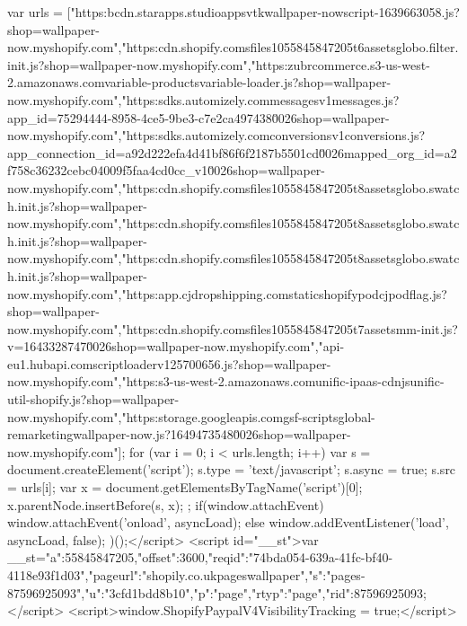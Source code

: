 {{{{{{{    var urls = ["https:\/\/bcdn.starapps.studio\/apps\/vtk\/wallpaper-now\/script-1639663058.js?shop=wallpaper-now.myshopify.com","https:\/\/cdn.shopify.com\/s\/files\/1\/0558\/4584\/7205\/t\/6\/assets\/globo.filter.init.js?shop=wallpaper-now.myshopify.com","https:\/\/zubrcommerce.s3-us-west-2.amazonaws.com\/variable-products\/variable-loader.js?shop=wallpaper-now.myshopify.com","https:\/\/sdks.automizely.com\/messages\/v1\/messages.js?app_id=75294444-8958-4ce5-9be3-c7e2ca497438\u0026shop=wallpaper-now.myshopify.com","https:\/\/sdks.automizely.com\/conversions\/v1\/conversions.js?app_connection_id=a92d222efa4d41bf86f6f2187b5501cd\u0026mapped_org_id=a2f758c36232cebc04009f5faa4cd0cc_v1\u0026shop=wallpaper-now.myshopify.com","https:\/\/cdn.shopify.com\/s\/files\/1\/0558\/4584\/7205\/t\/8\/assets\/globo.swatch.init.js?shop=wallpaper-now.myshopify.com","https:\/\/cdn.shopify.com\/s\/files\/1\/0558\/4584\/7205\/t\/8\/assets\/globo.swatch.init.js?shop=wallpaper-now.myshopify.com","https:\/\/cdn.shopify.com\/s\/files\/1\/0558\/4584\/7205\/t\/8\/assets\/globo.swatch.init.js?shop=wallpaper-now.myshopify.com","https:\/\/app.cjdropshipping.com\/static\/shopify\/pod\/cjpodflag.js?shop=wallpaper-now.myshopify.com","https:\/\/cdn.shopify.com\/s\/files\/1\/0558\/4584\/7205\/t\/7\/assets\/mm-init.js?v=1643328747\u0026shop=wallpaper-now.myshopify.com","\/\/api-eu1.hubapi.com\/scriptloader\/v1\/25700656.js?shop=wallpaper-now.myshopify.com","https:\/\/s3-us-west-2.amazonaws.com\/unific-ipaas-cdn\/js\/unific-util-shopify.js?shop=wallpaper-now.myshopify.com","https:\/\/storage.googleapis.com\/gsf-scripts\/global-remarketing\/wallpaper-now.js?1649473548\u0026shop=wallpaper-now.myshopify.com"];
    for (var i = 0; i < urls.length; i++) {
      var s = document.createElement('script');
      s.type = 'text/javascript';
      s.async = true;
      s.src = urls[i];
      var x = document.getElementsByTagName('script')[0];
      x.parentNode.insertBefore(s, x);
    }
  };
  if(window.attachEvent) {
    window.attachEvent('onload', asyncLoad);
  } else {
    window.addEventListener('load', asyncLoad, false);
  }
})();</script>
<script id="__st">var __st={"a":55845847205,"offset":3600,"reqid":"74bda054-639a-41fc-bf40-4118e93f1d03","pageurl":"shopily.co.uk\/pages\/wallpaper","s":"pages-87596925093","u":"3cfd1bdd8b10","p":"page","rtyp":"page","rid":87596925093};</script>
<script>window.ShopifyPaypalV4VisibilityTracking = true;</script>
}}}}}
